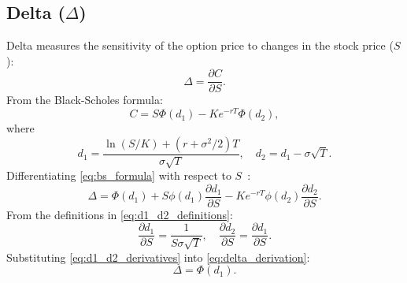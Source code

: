     \subsection{Delta ($\Delta$)}
        Delta measures the sensitivity of the option price to changes in the stock price ($S$):
        \begin{equation}
            \Delta = \frac{\partial C}{\partial S}.
            \label{eq:delta_definition}
        \end{equation}
        From the Black-Scholes formula:
        \begin{equation}
            C = S \Phi(d_1) - K e^{-rT} \Phi(d_2),
            \label{eq:bs_formula}
        \end{equation}
        where
        \begin{equation}
            d_1 = \frac{\ln(S/K) + (r + \sigma^2/2)T}{\sigma \sqrt{T}}, \quad d_2 = d_1 - \sigma \sqrt{T}.
            \label{eq:d1_d2_definitions}
        \end{equation}
        Differentiating \eqref{eq:bs_formula} with respect to $S$~\cite{borell_introduction_2012}:
        \begin{equation}
            \Delta = \Phi(d_1) + S \phi(d_1) \frac{\partial d_1}{\partial S} - K e^{-rT} \phi(d_2) \frac{\partial d_2}{\partial S}.
            \label{eq:delta_derivation}
        \end{equation}
        From the definitions in \eqref{eq:d1_d2_definitions}:
        \begin{equation}
            \frac{\partial d_1}{\partial S} = \frac{1}{S \sigma \sqrt{T}}, \quad \frac{\partial d_2}{\partial S} = \frac{\partial d_1}{\partial S}.
            \label{eq:d1_d2_derivatives}
        \end{equation}
        Substituting \eqref{eq:d1_d2_derivatives} into \eqref{eq:delta_derivation}:
        \begin{equation}
            \Delta = \Phi(d_1).
            \label{eq:delta_result}
        \end{equation}

